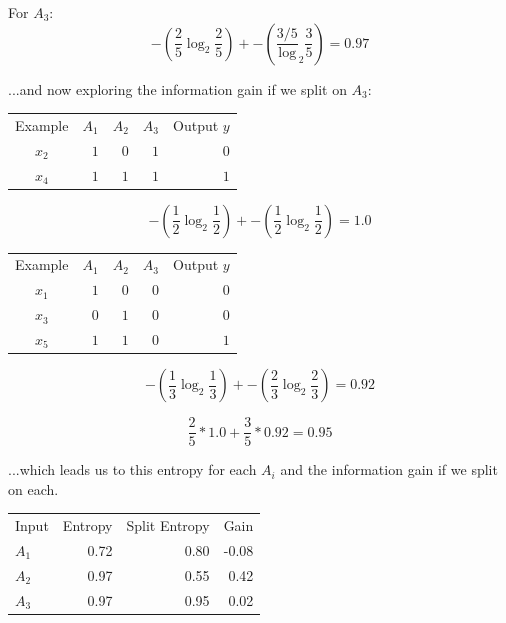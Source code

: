 \documentclass{article}
\begin{document}
\noindent For $A_3$:
\begin{equation}
    -(\frac{2}{5}\log_2{\frac{2}{5}}) + -(\frac{3/5}\log_2{\frac{3}{5}}) = 0.97
\end{equation}

\noindent ...and now exploring the information gain if we split on $A_3$:

\begin{center}
    \begin{tabular}{ c r r r r }
        Example & $A_1$ & $A_2$ & $A_3$ & Output $y$\\ 
        $x_2$ & $1$ & $0$ & $1$ & $0$\\
        $x_4$ & $1$ & $1$ & $1$ & $1$\\
    \end{tabular}
\end{center}

\begin{equation}
    -(\frac{1}{2}\log_2{\frac{1}{2}}) + -(\frac{1}{2}\log_2{\frac{1}{2}}) = 1.0
\end{equation}

\begin{center}
    \begin{tabular}{ c r r r r }
        Example & $A_1$ & $A_2$ & $A_3$ & Output $y$\\ 
        $x_1$ & $1$ & $0$ & $0$ & $0$\\
        $x_3$ & $0$ & $1$ & $0$ & $0$\\
        $x_5$ & $1$ & $1$ & $0$ & $1$\\
    \end{tabular}
\end{center}

\begin{equation}
    -(\frac{1}{3}\log_2{\frac{1}{3}}) + -(\frac{2}{3}\log_2{\frac{2}{3}}) = 0.92
\end{equation}

\begin{equation}
    \frac{2}{5}*1.0 + \frac{3}{5}*0.92 = 0.95
\end{equation}

\noindent ...which leads us to this entropy for each $A_i$ and the information gain if we split on each.

\begin{center}
    \begin{tabular}{l r r r}
        Input & Entropy & Split Entropy & Gain\\
        $A_1$ & 0.72 & 0.80 & -0.08\\
        $A_2$ & 0.97 & 0.55 & 0.42\\
        $A_3$ & 0.97 & 0.95 & 0.02\\
    \end{tabular}
\end{center}
\end{document}
